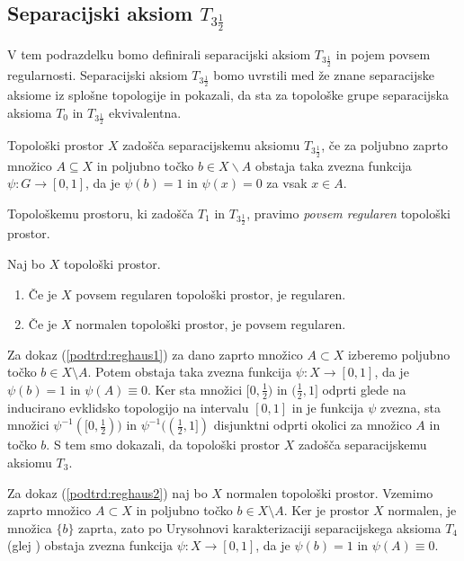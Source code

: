 \documentclass[mat1]{fmfdelo}
\begin{document}
\subsection{Separacijski aksiom $T_{3 \frac{1}{2}}$}
V tem podrazdelku bomo definirali separacijski aksiom $T_{3 \frac{1}{2}}$ in pojem povsem regularnosti. Separacijski aksiom $T_{3 \frac{1}{2}}$ bomo uvrstili med že znane separacijske aksiome iz splošne topologije in pokazali, da sta za topološke grupe separacijska aksioma $T_0$ in $T_{3 \frac{1}{2}}$ ekvivalentna.
\begin{definicija}
	Topološki prostor $X$ zadošča separacijskemu aksiomu $T_{3 \frac{1}{2}}$, če za poljubno zaprto množico $A \subseteq X$ in poljubno točko $b \in X\backslash A$ obstaja taka zvezna funkcija $\psi\colon G \to [0, 1]$, da je $\psi (b) = 1$ in $\psi (x) = 0$ za vsak $x \in A$.
\end{definicija}

\begin{definicija}
	Topološkemu prostoru, ki zadošča $T_1$ in $T_{3 \frac{1}{2}}$, pravimo \emph{povsem regularen} topološki prostor.
\end{definicija}

\begin{trditev}\label{pos:reghaus}
Naj bo $X$ topološki prostor.
\begin{enumerate}
\item Če je $X$ povsem regularen topološki prostor, je regularen.\label{podtrd:reghaus1}
\item Če je $X$ normalen topološki prostor, je povsem regularen.\label{podtrd:reghaus2}
\end{enumerate}
\end{trditev}

\begin{dokaz}
Za dokaz (\ref{podtrd:reghaus1}) za dano zaprto množico $A \subset X$ izberemo poljubno točko $b \in X \setminus A$. Potem obstaja taka zvezna funkcija $\psi\colon X \to [0, 1]$, da je $\psi(b) = 1$ in $\psi(A) \equiv 0$.
Ker sta množici $[0, \frac{1}{2})$ in $(\frac{1}{2}, 1]$ odprti glede na inducirano evklidsko topologijo na intervalu $[0, 1]$ in je funkcija $\psi$ zvezna, sta množici $\psi^{-1}([0, \frac{1}{2}))$ in $\psi^{-1}((\frac{1}{2}, 1])$ disjunktni odprti okolici za množico $A$ in točko $b$.
S tem smo dokazali, da topološki prostor $X$ zadošča separacijskemu aksiomu $T_3$.

Za dokaz (\ref{podtrd:reghaus2}) naj bo $X$ normalen topološki prostor. 
Vzemimo zaprto množico $A \subset X$ in poljubno točko $b \in X \setminus A$.
Ker je prostor $X$ normalen, je množica $\lbrace b \rbrace$ zaprta,
zato po Urysohnovi karakterizaciji separacijskega aksioma $T_4$ (glej \cite{bib:top}) obstaja zvezna funkcija $\psi\colon X \to [0, 1]$, da je $\psi(b) = 1$ in $\psi(A) \equiv 0$.
\end{dokaz}
\end{document}
